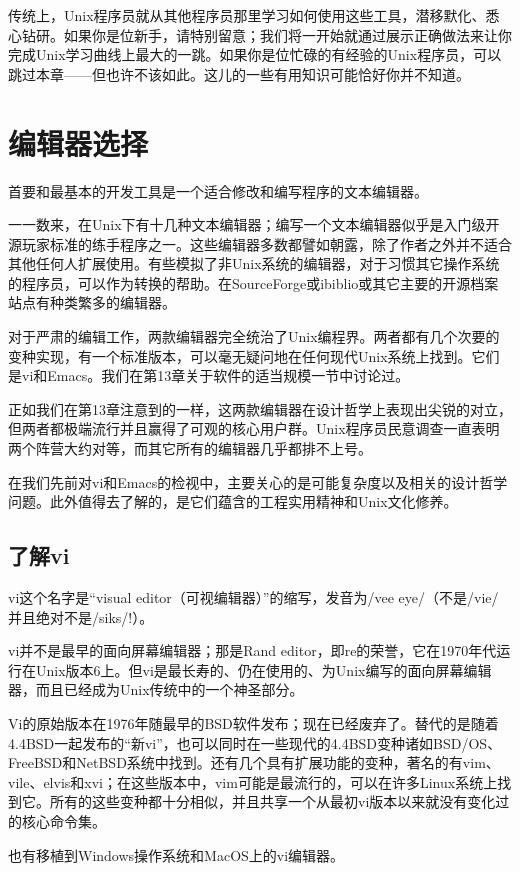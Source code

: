\documentclass[12pt,oneside]{book}
\begin{document}
\begin{common-format}
传统上，Unix程序员就从其他程序员那里学习如何使用这些工具，潜移默化、悉心钻研。如果你是位新手，请特别留意；我们将一开始就通过展示正确做法来让你完成Unix学习曲线上最大的一跳。如果你是位忙碌的有经验的Unix程序员，可以跳过本章——但也许不该如此。这儿的一些有用知识可能恰好你并不知道。

\section{编辑器选择}
首要和最基本的开发工具是一个适合修改和编写程序的文本编辑器。

一一数来，在Unix下有十几种文本编辑器；编写一个文本编辑器似乎是入门级开源玩家标准的练手程序之一。这些编辑器多数都譬如朝露，除了作者之外并不适合其他任何人扩展使用。有些模拟了非Unix系统的编辑器，对于习惯其它操作系统的程序员，可以作为转换的帮助。在SourceForge或ibiblio或其它主要的开源档案站点有种类繁多的编辑器。

对于严肃的编辑工作，两款编辑器完全统治了Unix编程界。两者都有几个次要的变种实现，有一个标准版本，可以毫无疑问地在任何现代Unix系统上找到。它们是vi和Emacs。我们在第13章关于软件的适当规模一节中讨论过。

正如我们在第13章注意到的一样，这两款编辑器在设计哲学上表现出尖锐的对立，但两者都极端流行并且赢得了可观的核心用户群。Unix程序员民意调查一直表明两个阵营大约对等，而其它所有的编辑器几乎都排不上号。

在我们先前对vi和Emacs的检视中，主要关心的是可能复杂度以及相关的设计哲学问题。此外值得去了解的，是它们蕴含的工程实用精神和Unix文化修养。

\subsection{了解vi}
vi这个名字是“visual editor（可视编辑器）”的缩写，发音为/vee eye/（不是/vie/并且绝对不是/siks/!）。

vi并不是最早的面向屏幕编辑器；那是Rand editor，即re的荣誉，它在1970年代运行在Unix版本6上。但vi是最长寿的、仍在使用的、为Unix编写的面向屏幕编辑器，而且已经成为Unix传统中的一个神圣部分。

Vi的原始版本在1976年随最早的BSD软件发布；现在已经废弃了。替代的是随着4.4BSD一起发布的“新vi”，也可以同时在一些现代的4.4BSD变种诸如BSD/OS、FreeBSD和NetBSD系统中找到。还有几个具有扩展功能的变种，著名的有vim、vile、elvis和xvi；在这些版本中，vim可能是最流行的，可以在许多Linux系统上找到它。所有的这些变种都十分相似，并且共享一个从最初vi版本以来就没有变化过的核心命令集。

也有移植到Windows操作系统和MacOS上的vi编辑器。


\end{common-format}
\end{document}
